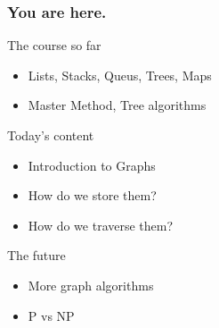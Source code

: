 \begin{frame}
	\frametitle{You are here.}
	\begin{block}{The course so far}
		\begin{itemize}
			\item Lists, Stacks, Queus, Trees, Maps
			\item Master Method, Tree algorithms
		\end{itemize}
	\end{block}
	\pause
	\begin{exampleblock}{Today's content}
		\begin{itemize}
			\item Introduction to Graphs
			\item How do we store them?
			\item How do we traverse them?
		\end{itemize}
	\end{exampleblock}
	\pause
	\begin{block}{The future}
		\begin{itemize}
			\item More graph algorithms
			\item P vs NP
		\end{itemize}
	\end{block}
\end{frame}
